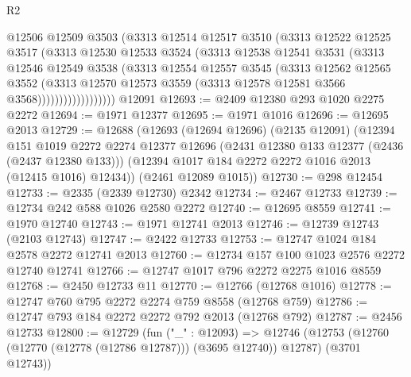 \begin{lexlean}{R2}
\begin{coremodule}
                      @12506
                      @12509
                      @3503
                      (@3313
                        @12514
                        @12517
                        @3510
                        (@3313
                          @12522
                          @12525
                          @3517
                          (@3313
                            @12530
                            @12533
                            @3524
                            (@3313
                              @12538
                              @12541
                              @3531
                              (@3313
                                @12546
                                @12549
                                @3538
                                (@3313
                                  @12554
                                  @12557
                                  @3545
                                  (@3313
                                    @12562
                                    @12565
                                    @3552
                                    (@3313
                                      @12570
                                      @12573
                                      @3559
                                      (@3313 @12578 @12581 @3566 @3568))))))))))))))))))
    @12091
@12693 := @2409 @12380 @293 @1020 @2275 @2272
@12694 := @1971 @12377
@12695 := @1971 @1016
@12696 := @12695 @2013
@12729 := @12688
    (@12693
      (@12694 @12696)
      (@2135 @12091)
      (@12394
        @151
        @1019
        @2272
        @2274
        @12377
        @12696
        (@2431 @12380 @133 @12377 (@2436 (@2437 @12380 @133)))
        (@12394 @1017 @184 @2272 @2272 @1016 @2013 (@12415 @1016) @12434))
      (@2461 @12089 @1015))
@12730 := @298 @12454
@12733 := @2335 (@2339 @12730) @2342
@12734 := @2467 @12733
@12739 := @12734 @242 @588 @1026 @2580 @2272
@12740 := @12695 @8559
@12741 := @1970 @12740
@12743 := @1971 @12741 @2013
@12746 := @12739 @12743 (@2103 @12743)
@12747 := @2422 @12733
@12753 := @12747 @1024 @184 @2578 @2272 @12741 @2013
@12760 := @12734 @157 @100 @1023 @2576 @2272 @12740 @12741
@12766 := @12747 @1017 @796 @2272 @2275 @1016 @8559
@12768 := @2450 @12733 @11
@12770 := @12766 (@12768 @1016)
@12778 := @12747 @760 @795 @2272 @2274 @759 @8558 (@12768 @759)
@12786 := @12747 @793 @184 @2272 @2272 @792 @2013 (@12768 @792)
@12787 := @2456 @12733
@12800 := @12729
    (fun ("_" : @12093) =>
    @12746 (@12753 (@12760 (@12770 (@12778 (@12786 @12787))) (@3695 @12740)) @12787) (@3701 @12743))

\end{coremodule}
\end{lexlean}
